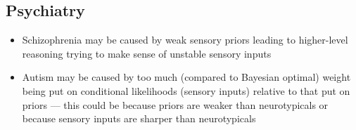 \documentclass[20pt,a4paper,landscape]{extarticle}
\begin{document}
\begin{flushleft}
\subsection{Psychiatry}
\begin{itemize}
\item Schizophrenia may be caused by weak sensory priors leading to higher-level reasoning trying to make sense of unstable sensory inputs
\item Autism may be caused by too much (compared to Bayesian optimal) weight being put on conditional likelihoods (sensory inputs) relative to that put on priors --- this could be because priors are weaker than neurotypicals or because sensory inputs are sharper than neurotypicals
\end{itemize}
\end{flushleft}
\end{document}
